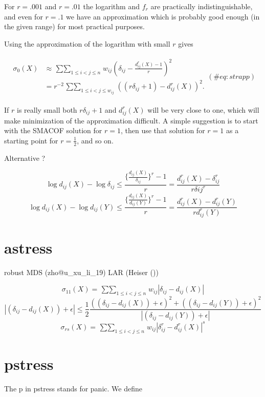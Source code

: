 \documentclass[
  12pt,
  letterpaper,
  DIV=11,
  numbers=noendperiod]{scrreprt}
\theoremstyle{remark}
\begin{document}
For \(r=.001\) and \(r=.01\) the logarithm and \(f_r\) are practically
indistinguishable, and even for \(r=.1\) we have an approximation which
is probably good enough (in the given range) for most practical
purposes.

Using the approximation of the logarithm with small \(r\) gives

\begin{align}
\begin{split}
\sigma_0(X)&\approx
\mathop{\sum\sum}_{1\leq i<j\leq n}w_{ij}(\delta_{ij}-\frac{d_{ij}^r(X)-1}{r})^2\\
&=r^{-2}\mathop{\sum\sum}_{1\leq i<j\leq w_{ij}}((r\delta_{ij}+1)-d_{ij}^r(X))^2.
\end{split}
(\#eq:strapp)
\end{align}

If \(r\) is really small both \(r\delta_{ij}+1\) and \(d_{ij}^r(X)\)
will be very close to one, which will make minimization of the
approximation difficult. A simple suggestion is to start with the SMACOF
solution for \(r=1\), then use that solution for \(r=1\) as a starting
point for \(r=\frac12\), and so on.

Alternative ?

\[
\log d_{ij}(X)-\log \delta_{ij}\leq \frac{\{\frac{d_{ij}(X)}{\delta_{ij}}\}^r-1}{r}=\frac{d_{ij}^r(X)-\delta_{ij}^r}{r\delta{ij}^r}
\] \[
\log d_{ij}(X)-\log d_{ij}(Y)\leq \frac{\{\frac{d_{ij}(X)}{d_{ij}(Y)}\}^r-1}{r}=\frac{d_{ij}^r(X)-d_{ij}^r(Y)}{rd_{ij}^r(Y)}
\]

\section{astress}\label{astress}

robust MDS (zho@u\_xu\_li\_19) LAR (Heiser
())

\[
\sigma_{11}(X)=\mathop{\sum\sum}_{1\leq i<j\leq n}w_{ij}|\delta_{ij}-d_{ij}(X)|
\] \[
|(\delta_{ij}-d_{ij}(X))+\epsilon|\leq\frac12\frac{((\delta_{ij}-d_{ij}(X))+\epsilon)^2+((\delta_{ij}-d_{ij}(Y))+\epsilon)^2}{|(\delta_{ij}-d_{ij}(Y))+\epsilon|}
\] \[
\sigma_{rs}(X)=\mathop{\sum\sum}_{1\leq i<j\leq n}w_{ij}|\delta_{ij}^r-d_{ij}^r(X)|^s
\]

\section{pstress}\label{pstress}

The p in pstress stands for panic. We define
\end{document}
